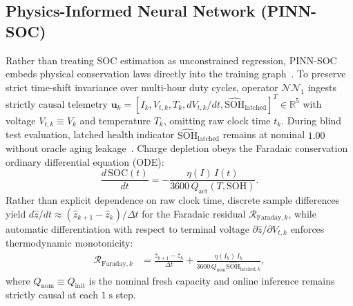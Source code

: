 \documentclass[10pt,a4paper]{article}
\begin{document}
\subsection{Physics-Informed Neural Network (PINN-SOC)}
Rather than treating SOC estimation as unconstrained regression, PINN-SOC embeds physical conservation laws directly into the training graph~\cite{Raissi2019pinn,Brancato2026}. To preserve strict time-shift invariance over multi-hour duty cycles, operator $\mathcal{NN}_1$ ingests strictly causal telemetry $\mathbf{u}_k = [I_k, V_{t,k}, T_k, dV_{t,k}/dt, \hat{\text{SOH}}_{\text{latched}}]^T \in \mathbb{R}^5$ with voltage $V_{t,k} \equiv V_k$ and temperature $T_k$, omitting raw clock time $t_k$. During blind test evaluation, latched health indicator $\hat{\text{SOH}}_{\text{latched}}$ remains at nominal $1.00$ without oracle aging leakage~\cite{Le2026charging}. Charge depletion obeys the Faradaic conservation ordinary differential equation (ODE):
\begin{equation}\label{eqn:pinn_ode}
\frac{d\,\text{SOC}(t)}{dt} = -\frac{\eta(I)\, I(t)}{3600\,Q_{\text{act}}(T, \text{SOH})}.
\end{equation}
Rather than explicit dependence on raw clock time, discrete sample differences yield $d\hat{z}/dt \approx (\hat{z}_{k+1} - \hat{z}_k)/\Delta t$ for the Faradaic residual $\mathcal{R}_{\text{Faraday},k}$, while automatic differentiation with respect to terminal voltage $\partial \hat{z}/\partial V_{t,k}$ enforces thermodynamic monotonicity:
\begin{align}
\mathcal{R}_{\text{Faraday},k} &= \frac{\hat{z}_{k+1} - \hat{z}_k}{\Delta t} + \frac{\eta(I_k)\, I_k}{3600\,Q_{\text{nom}} \hat{\text{SOH}}_{\text{latched},k}}, \label{eqn:res_faraday}
\end{align}
where $Q_{\text{nom}} \equiv Q_{\text{init}}$ is the nominal fresh capacity and online inference remains strictly causal at each $1\;\mathrm{s}$ step.
\end{document}
